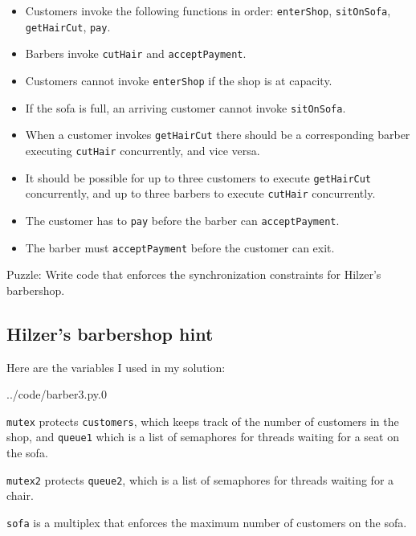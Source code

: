 \documentclass{book}
\begin{document}
\begin{itemize}

\item Customers invoke the following functions in order:
{\tt enterShop}, {\tt sitOnSofa},
{\tt getHairCut}, {\tt pay}.

\item Barbers invoke {\tt cutHair} and {\tt acceptPayment}.

\item Customers cannot invoke {\tt enterShop} if the shop
is at capacity.

\item If the sofa is full, an arriving customer cannot invoke 
{\tt sitOnSofa}.

\item When a customer invokes {\tt getHairCut} there should be
a corresponding barber executing {\tt cutHair} concurrently,
and vice versa.

\item It should be possible for up to three customers to execute
{\tt getHairCut} concurrently, and up to three barbers to execute
{\tt cutHair} concurrently.

\item The customer has to {\tt pay} before the barber can
{\tt acceptPayment}.

\item The barber must {\tt acceptPayment} before the customer can
exit.

\end{itemize}

Puzzle: Write code that enforces the synchronization
constraints for Hilzer's barbershop.


\subsection {Hilzer's barbershop hint}

Here are the variables I used in my solution:


{../code/barber3.py.0}

{\tt mutex} protects {\tt customers}, which keeps track of the
number of customers in the shop, and {\tt queue1} which is a list
of semaphores for threads waiting for a seat on the sofa.

{\tt mutex2} protects {\tt queue2}, which is a list
of semaphores for threads waiting for a chair.

{\tt sofa} is a multiplex that enforces the maximum number of customers
on the sofa.
\end{document}
